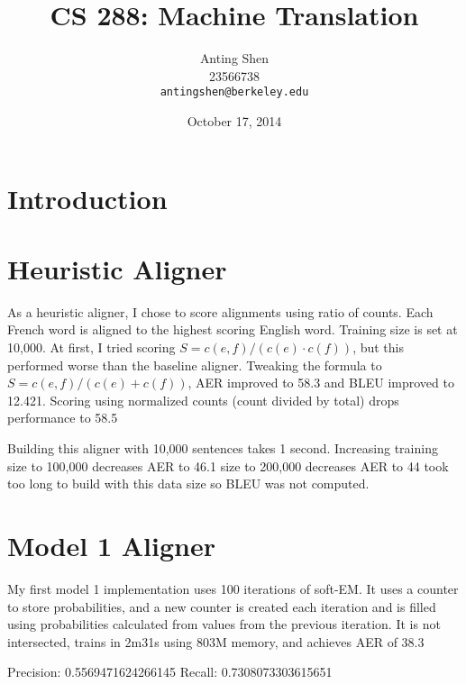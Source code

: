 \documentclass[11pt]{article}
\title{CS 288: Machine Translation}
\author{Anting Shen \\
  23566738 \\
  {\tt antingshen@berkeley.edu} \\
}
\date{October 17, 2014}
\begin{document}
\maketitle

\section{Introduction}


\section{Heuristic Aligner}

As a heuristic aligner, I chose to score alignments using ratio of counts. Each French word
is aligned to the highest scoring English word. Training size is set at 10,000.
At first, I tried scoring $S = c(e, f) / (c(e) \cdot c(f))$, but this performed worse than the
baseline aligner. Tweaking the formula to $S = c(e, f) / (c(e) + c(f))$, AER improved to 58.3%
and BLEU improved to 12.421. Scoring using normalized counts (count divided by total) drops
performance to 58.5%

Building this aligner with 10,000 sentences takes 1 second. Increasing training size to 100,000
decreases AER to 46.1%
size to 200,000 decreases AER to 44%
took too long to build with this data size so BLEU was not computed.

\section{Model 1 Aligner}

My first model 1 implementation uses 100 iterations of soft-EM. It uses a counter to store
probabilities, and a new counter is created each iteration and is filled using probabilities
calculated from values from the previous iteration. It is not intersected, trains in 2m31s
using 803M memory, and achieves AER of 38.3%

Precision: 0.5569471624266145
Recall: 0.7308073303615651
\end{document}
